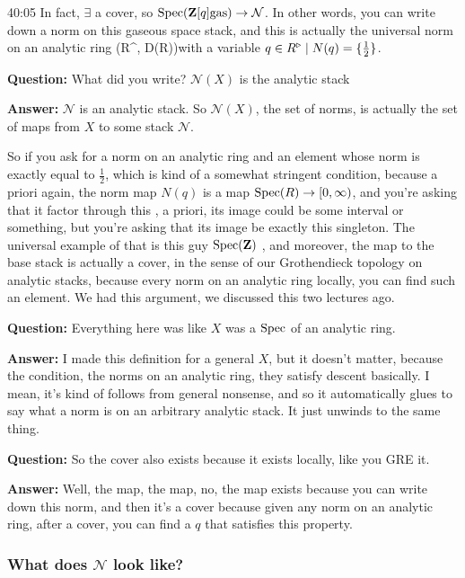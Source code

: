\begin{example}
\begin{unfinished}{40:05}
In fact, $\exists$ a cover, so $\operatorname{Spec}(\mathbf Z[q]\mathrm{gas}) \to \mathcal{N}$. In other words, you can write down a norm on this gaseous space stack, and this is actually the universal norm on an analytic ring (R^\tri, D(R))with a variable $q \in R^\triangleright \mid  N(q) = \{ \frac{1}{2} \}$. 


\textbf{Question:} What did you write? $\mathcal{N}(X)$ is the analytic stack

\textbf{Answer:} $\mathcal{N}$ is an analytic stack. So $\mathcal{N}(X)$, the set of norms, is actually the set of maps from $X$ to some stack $\mathcal{N}$.

So if you ask for a norm on an analytic ring and an element whose norm is exactly equal to $\frac{1}{2}$, which is kind of a somewhat stringent condition, because a priori again, the norm map $N(q)$ is a map $\operatorname{Spec}(R) \to [0, \infty)$, and you're asking that it factor through this , a priori, its image could be some interval or something, but you're asking that its image be exactly this singleton. The universal example of that is this guy $\operatorname{Spec}(\mathbf Z)$ , and moreover, the map to the base stack is actually a cover, in the sense of our Grothendieck topology on analytic stacks, because every norm on an analytic ring locally, you can find such an element. We had this argument, we discussed this two lectures ago. 

\textbf{Question:} Everything here was like $X$ was a $\operatorname{Spec}$ of an analytic ring. 

\textbf{Answer:} I made this definition for a general $X$, but it doesn't matter, because the condition, the norms on an analytic ring, they satisfy descent basically. I mean, it's kind of follows from general nonsense, and so it automatically glues to say what a norm is on an arbitrary analytic stack. It just unwinds to the same thing. 

\textbf{Question:} So the cover also exists because it exists locally, like you GRE it. 

\textbf{Answer:} Well, the map, the map, no, the map exists because you can write down this norm, and then it's a cover because given any norm on an analytic ring, after a cover, you can find a $q$ that satisfies this property.


\subsubsection{What does $\mathcal{N}$ look like?} \label{subsubsec:what_does_n_look_like}


\end{unfinished}
\end{example}
